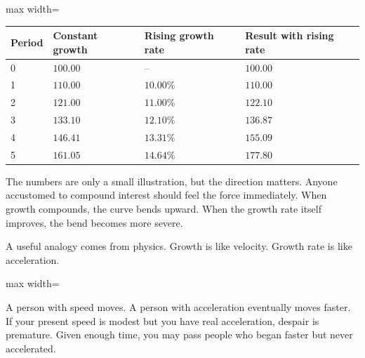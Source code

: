 \begin{center}
\begin{adjustbox}{max width=\linewidth}
\begin{tabular}{llll}
\hline
Period & Constant growth & Rising growth rate & Result with rising rate \\
\hline
0 & \(100.00\) & -- & \(100.00\) \\
1 & \(110.00\) & \(10.00\%\) & \(110.00\) \\
2 & \(121.00\) & \(11.00\%\) & \(122.10\) \\
3 & \(133.10\) & \(12.10\%\) & \(136.87\) \\
4 & \(146.41\) & \(13.31\%\) & \(155.09\) \\
5 & \(161.05\) & \(14.64\%\) & \(177.80\) \\
\hline
\end{tabular}
\end{adjustbox}
\end{center}

The numbers are only a small illustration, but the direction matters. Anyone accustomed to compound interest should feel the force immediately. When growth compounds, the curve bends upward. When the growth rate itself improves, the bend becomes more severe.

A useful analogy comes from physics. Growth is like velocity. Growth rate is like acceleration.

\begin{center}
\begin{adjustbox}{max width=\linewidth}
\end{adjustbox}
\end{center}

A person with speed moves. A person with acceleration eventually moves faster. If your present speed is modest but you have real acceleration, despair is premature. Given enough time, you may pass people who began faster but never accelerated.

